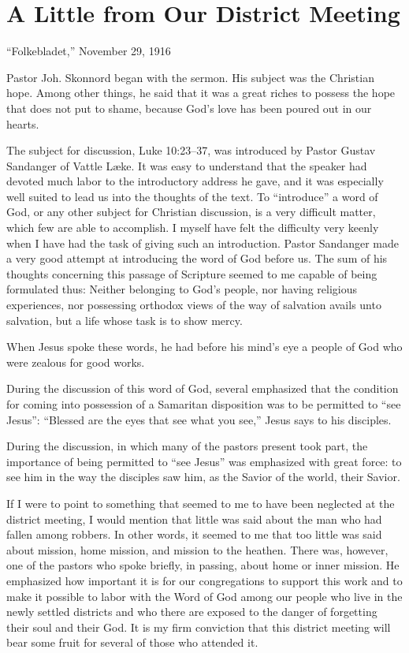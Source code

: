 
\section{A Little from Our District Meeting}

“Folkebladet,” November 29, 1916

Pastor Joh. Skonnord began with the sermon. His subject was the Christian hope. Among other things, he said that it was a great riches to possess the hope that does not put to shame, because God’s love has been poured out in our hearts.

The subject for discussion, Luke 10:23–37, was introduced by Pastor Gustav Sandanger of Vattle Læke. It was easy to understand that the speaker had devoted much labor to the introductory address he gave, and it was especially well suited to lead us into the thoughts of the text. To “introduce” a word of God, or any other subject for Christian discussion, is a very difficult matter, which few are able to accomplish. I myself have felt the difficulty very keenly when I have had the task of giving such an introduction. Pastor Sandanger made a very good attempt at introducing the word of God before us. The sum of his thoughts concerning this passage of Scripture seemed to me capable of being formulated thus: Neither belonging to God’s people, nor having religious experiences, nor possessing orthodox views of the way of salvation avails unto salvation, but a life whose task is to show mercy.

When Jesus spoke these words, he had before his mind’s eye a people of God who were zealous for good works.

During the discussion of this word of God, several emphasized that the condition for coming into possession of a Samaritan disposition was to be permitted to “see Jesus”: “Blessed are the eyes that see what you see,” Jesus says to his disciples.

During the discussion, in which many of the pastors present took part, the importance of being permitted to “see Jesus” was emphasized with great force: to see him in the way the disciples saw him, as the Savior of the world, their Savior.

If I were to point to something that seemed to me to have been neglected at the district meeting, I would mention that little was said about the man who had fallen among robbers. In other words, it seemed to me that too little was said about mission, home mission, and mission to the heathen. There was, however, one of the pastors who spoke briefly, in passing, about home or inner mission. He emphasized how important it is for our congregations to support this work and to make it possible to labor with the Word of God among our people who live in the newly settled districts and who there are exposed to the danger of forgetting their soul and their God. It is my firm conviction that this district meeting will bear some fruit for several of those who attended it.

